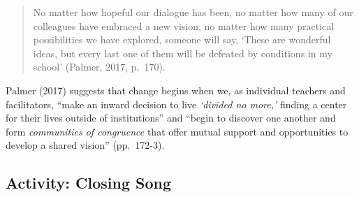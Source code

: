 \documentclass[
]{book}
\begin{document}
\begin{quote}
No matter how hopeful our dialogue has been, no matter how many of our colleagues have embraced a new vision, no matter how many practical possibilities we have explored, someone will say, `These are wonderful ideas, but every last one of them will be defeated by conditions in my school' (Palmer, 2017, p.~170).
\end{quote}

Palmer (2017) suggests that change begins when we, as individual teachers and facilitators, ``make an inward decision to live \emph{`divided no more,'} finding a center for their lives outside of institutions'' and ``begin to discover one another and form \emph{communities of congruence} that offer mutual support and opportunities to develop a shared vision'' (pp.~172-3).

\hypertarget{activity-closing-song}{%
\subsection{Activity: Closing Song}\label{activity-closing-song}}
\end{document}

